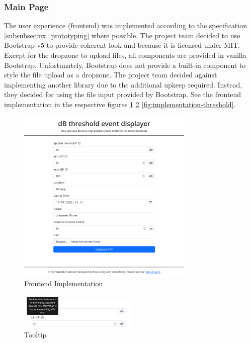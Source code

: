 \subsubsection{Main Page}\label{subsubsec:main-page}
The user experience (frontend) was implemented according to the specification \ref{subsubsec:ux_prototyping} where possible.
The project team decided to use Bootstrap v5 to provide coherent look and because it is licensed under MIT. Except for the dropzone to upload files,
all components are provided in vanilla Bootstrap. Unfortunately, Bootstrap does not provide a built-in component to style the file upload as a dropzone.
The project team decided against implementing another library due to the additional upkeep required. Instead, they decided for using the file input provided by Bootstrap.
See the frontend implementation in the respective figures \ref{fig:implementation-frontend} \ref{fig:implementation-tooltip} \ref{fig:implementation-threshold}.
\begin{figure}[H]
    \centering
    \includegraphics[width=0.75\textwidth]{../assets/implementation_form.png}
    \caption{Frontend Implementation}\label{fig:implementation-frontend}
\end{figure}
\begin{figure}[H]
    \centering
    \includegraphics[width=0.5\textwidth]{../assets/implementation_tooltip.png}
    \caption{Tooltip}\label{fig:implementation-tooltip}
\end{figure}
